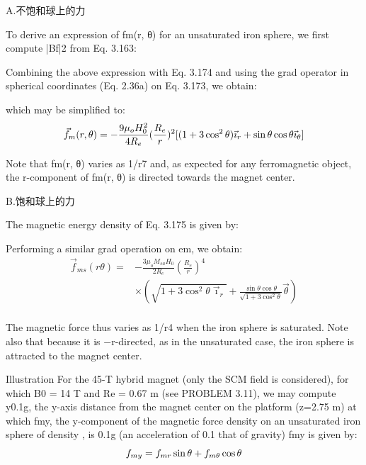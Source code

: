 A.不饱和球上的力

To derive an expression of fm(r, θ) for an unsaturated iron sphere, we first compute
|Bf|2 from Eq. 3.163:

Combining the above expression with Eq. 3.174 and using the grad operator in
spherical coordinates (Eq. 2.36a) on Eq. 3.173, we obtain:

which may be simplified to:
\begin{equation}
\vec{f}_{m}(r,\theta)=-\frac{9\mu_{o}H_{0}^{2}}{4R_{e}}(\frac{R_{e}}{r})^{2}[(1+3\cos^{2}\theta)\vec{\imath}_{r}+\sin\theta\cos\theta\vec{\imath}_{\theta}]\\%
\end{equation}

Note that fm(r, θ) varies as 1/r7 and, as expected for any ferromagnetic object,
the r-component of fm(r, θ) is directed towards the magnet center.

B.饱和球上的力

The magnetic energy density of Eq. 3.175 is given by:

Performing a similar grad operation on em, we obtain:
\begin{equation}
\begin{split}
\vec{f}_{ms}(r\theta)=&-\frac{3\mu_{o}M_{sa}H_{0}}{2R_{e}}(\frac{R_{e}}{r})^{4}\\
&\times(\sqrt{1+3\cos^{2}\theta\vec{\imath}_{r}}+\frac{\sin\theta\cos\theta}{\sqrt{1+3\cos^{2}\theta}}\vec{\theta})\\%
\end{split}
\end{equation}

The magnetic force thus varies as 1/r4 when the iron sphere is saturated. Note
also that because it is −r-directed, as in the unsaturated case, the iron sphere is
attracted to the magnet center.

Illustration For the 45-T hybrid magnet (only the SCM field is considered), for
which B0 = 14 T and Re = 0.67 m (see PROBLEM 3.11), we may compute y0.1g,
the y-axis distance from the magnet center on the platform (z=2.75 m) at which
fmy, the y-component of the magnetic force density on an unsaturated iron sphere
of density , is 0.1g (an acceleration of 0.1 that of gravity) fmy is given by:
\begin{equation}
f_{my}=f_{mr}\sin\theta+f_{m\theta}\cos\theta\\%
\end{equation}

